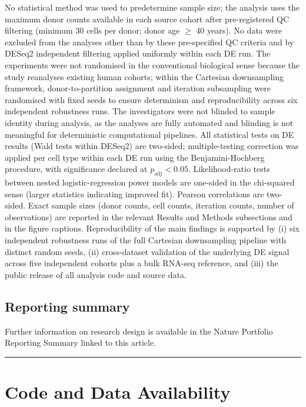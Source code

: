 \documentclass[
]{article}
\begin{document}
No statistical method was used to predetermine sample size; the analysis
uses the maximum donor counts available in each source cohort after
pre-registered QC filtering (minimum 30 cells per donor; donor age
\(\geq\) 40 years). No data were excluded from the analyses other than
by these pre-specified QC criteria and by DESeq2 independent filtering
applied uniformly within each DE run. The experiments were not
randomised in the conventional biological sense because the study
reanalyses existing human cohorts; within the Cartesian downsampling
framework, donor-to-partition assignment and iteration subsampling were
randomised with fixed seeds to ensure determinism and reproducibility
across six independent robustness runs. The investigators were not
blinded to sample identity during analysis, as the analyses are fully
automated and blinding is not meaningful for deterministic computational
pipelines. All statistical tests on DE results (Wald tests within
DESeq2) are two-sided; multiple-testing correction was applied per cell
type within each DE run using the Benjamini-Hochberg procedure, with
significance declared at \(p_{\mathrm{adj}} < 0.05\). Likelihood-ratio
tests between nested logistic-regression power models are one-sided in
the chi-squared sense (larger statistics indicating improved fit).
Pearson correlations are two-sided. Exact sample sizes (donor counts,
cell counts, iteration counts, number of observations) are reported in
the relevant Results and Methods subsections and in the figure captions.
Reproducibility of the main findings is supported by (i) six independent
robustness runs of the full Cartesian downsampling pipeline with
distinct random seeds, (ii) cross-dataset validation of the underlying
DE signal across five independent cohorts plus a bulk RNA-seq reference,
and (iii) the public release of all analysis code and source data.

\subsection{Reporting summary}\label{reporting-summary}

Further information on research design is available in the Nature
Portfolio Reporting Summary linked to this article.

\begin{center}\rule{0.5\linewidth}{0.5pt}\end{center}

\section{Code and Data Availability}\label{code-and-data-availability}
\end{document}
